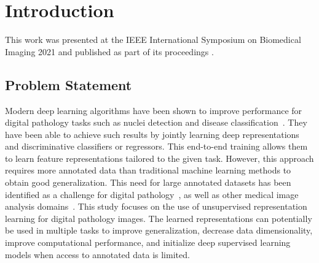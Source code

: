 \section{Introduction}
\label{sec:unsupervised_intro}
This work was presented at the IEEE International Symposium on Biomedical Imaging 2021 and published as part of its proceedings \citep{carse2021unsupervised}.

\subsection{Problem Statement}
\label{subsec:unsupervised_problem}
Modern deep learning algorithms have been shown to improve performance for digital pathology tasks such as nuclei detection and disease classification~\cite{litjens2017survey}. They have been able to achieve such results by jointly learning deep representations and discriminative classifiers or regressors. This end-to-end training allows them to learn feature representations tailored to the given task. However, this approach requires more annotated data than traditional machine learning methods to obtain good generalization. This need for large annotated datasets has been identified as a challenge for digital pathology~\cite{madabhushi2016image}, as well as other medical image analysis domains~\cite{litjens2017survey}. This study focuses on the use of unsupervised representation learning for digital pathology images. The learned representations can potentially be used in multiple tasks to improve generalization, decrease data dimensionality, improve computational performance, and initialize deep supervised learning models when access to annotated data is limited. 


